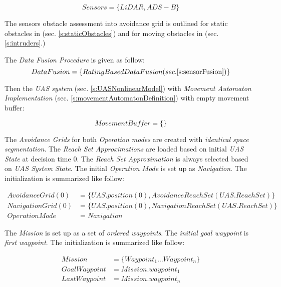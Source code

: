 \begin{equation}
    Sensors = \{LiDAR,ADS-B\}
\end{equation}

\noindent The sensors obstacle assessment into avoidance grid is outlined for static obstacles in (sec. \ref{s:staticObstacles}) and for moving obstacles in (sec. \ref{s:intruders}.)

The \emph{Data Fusion Procedure} is given as follow:
\begin{equation}
    DataFusion = \{Rating Based Data Fusion (sec. \ref{s:sensorFusion})\}
\end{equation}

Then the \emph{UAS system} (sec. \ref{s:UASNonlinearModel}) with \emph{Movement Automaton Implementation} (sec. \ref{s:movementAutomatonDefinition}) with empty movement buffer:

\begin{equation}
    Movement Buffer = \{\}
\end{equation}

The \emph{Avoidance Grids} for both \emph{Operation modes} are created with \emph{identical space segmentation}. The \emph{Reach Set Approximations} are loaded based on initial \emph{UAS State} at decision time $0$. The \emph{Reach Set Approximation} is always selected based on \emph{UAS System State}. The initial \emph{Operation Mode} is set up as \emph{Navigation}. The initialization is summarized like follow:

\begin{equation}
    \begin{aligned}
    Avoidance Grid(0) &= \{UAS.position(0),AvoidanceReachSet(UAS.ReachSet)\}\\
    Navigation Grid (0) &= \{UAS.position(0), NavigationReachSet(UAS.ReachSet)\}\\
    Operation Mode &= Navigation
    \end{aligned}
\end{equation}

The \emph{Mission} is set up as a set of \emph{ordered waypoints}. The \emph{initial goal waypoint} is \emph{first waypoint}. The initialization is summarized like follow:

\begin{equation}
    \begin{aligned}
    Mission &= \{Waypoint_1 \dots  Waypoint_n\}\\
    Goal Waypoint &= Mission.waypoint_1\\
    Last Waypoint &= Mission.waypoint_n\\
    \end{aligned}
\end{equation}

